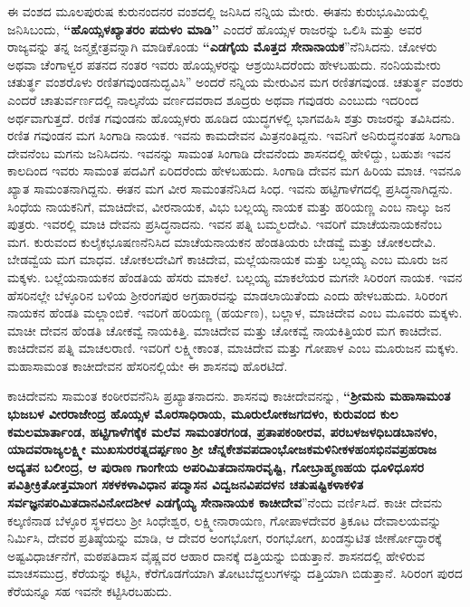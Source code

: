 ಈ ವಂಶದ ಮೂಲಪುರುಷ ಕುರುನಂದನರ ವಂಶದಲ್ಲಿ ಜನಿಸಿದ ನನ್ನಿಯ ಮೇರು. ಈತನು ಕುರುಭೂಮಿಯಲ್ಲಿ ಜನಿಸಿಬಂದು, \textbf{“ಹೊಯ್ಸಳಖ್ಯಾತರಂ ಪದುಳಂ ಮಾಡಿ”} ಎಂದರೆ ಹೊಯ್ಸಳ ರಾಜರನ್ನು ಒಲಿಸಿ ಮತ್ತು ಅವರ ರಾಜ್ಯವನ್ನು ತನ್ನ ಜನ್ಮಕ್ಷೇತ್ರವನ್ನಾಗಿ ಮಾಡಿಕೊಂಡು \textbf{“ಎಡಗೈಯ ಮೊತ್ತದ ಸೇನಾನಾಯಕ}”ನೆನಿಸಿದನು. ಚೋಳರು ಅಥವಾ ಚೆಂಗಾಳ್ವರ ಪತನದ ನಂತರ ಇವರು ಹೊಯ್ಸಳರನ್ನು ಆಶ್ರಯಿಸಿದರೆಂದು ಹೇಳಬಹುದು. ನಂನಿಯಮೇರು ಚತುರ್ತ್ಥ ವಂಶರೊಳು ರಣಿತಗವುಂಡನುದ್ಭವಿಸಿ” ಅಂದರೆ ನನ್ನಿಯ ಮೇರುವಿನ ಮಗ ರಣಿತಗವುಂಡ. ಚತುರ್ತ್ಥ ವಂಶರು ಎಂದರೆ ಚಾತುರ್ವರ್ಣದಲ್ಲಿ ನಾಲ್ಕನೆಯ ವರ್ಣದವರಾದ ಶೂದ್ರರು ಅಥವಾ ಗವುಡರು ಎಂಬುದು ಇದರಿಂದ ಅರ್ಥವಾಗುತ್ತದೆ. ರಣಿತ ಗವುಂಡನು ಹೊಯ್ಸಳರು ಹೂಡಿದ ಯುದ್ಧಗಳಲ್ಲಿ ಭಾಗವಹಿಸಿ ಶತ್ರು ರಾಜರನ್ನು ತವಿಸಿದನು. ರಣಿತ ಗವುಂಡನ ಮಗ ಸಿಂಗಾಡಿ ನಾಯಕ. ಇವನು ಕಾಮದೇವನ ಮಿತ್ರನಂತಿದ್ದನು. ಇವನಿಗೆ ಅನಿರುದ್ಧನಂತಹ ಸಿಂಗಾಡಿ ದೇವನೆಂಬ ಮಗನು ಜನಿಸಿದನು. ಇವನನ್ನು ಸಾಮಂತ ಸಿಂಗಾಡಿ ದೇವನೆಂದು ಶಾಸನದಲ್ಲಿ ಹೇಳಿದ್ದು, ಬಹುಶಃ ಇವನ ಕಾಲದಿಂದ ಇವರು ಸಾಮಂತ ಪದವಿಗೆ ಏರಿದರೆಂದು ಹೇಳಬಹುದು. ಸಿಂಗಾಡಿ ದೇವನ ಮಗ ಹಿರಿಯ ಮಾಚ. ಇವನೂ ಖ್ಯಾತ ಸಾಮಂತನಾಗಿದ್ದನು. ಈತನ ಮಗ ವೀರ ಸಾಮಂತನೆನಿಸಿದ ಸಿಂಧ. ಇವನು ಹಟ್ಟಿಗಾಳೆಗದಲ್ಲಿ ಪ್ರಸಿದ್ಧನಾಗಿದ್ದನು. ಸಿಂಧೆಯ ನಾಯಕನಿಗೆ, ಮಾಚಿದೇವ, ವೀರನಾಯಕ, ವಿಭು ಬಲ್ಲಯ್ಯ ನಾಯಕ ಮತ್ತು ಹರಿಯಣ್ಣ ಎಂಬ ನಾಲ್ಕು ಜನ ಪುತ್ರರು. ಇವರಲ್ಲಿ ಮಾಚಿ ದೇವನು ಪ್ರಸಿದ್ಧನಾದನು. ಇವನ ಪತ್ನಿ ಬಮ್ಮಲದೇವಿ. ಇವರಿಗೆ ಮಾಚೆಯನಾಯಕನೆಂಬ ಮಗ. ಕುರುವಂದ ಕುಲೈಕಭೂಷಣನೆನಿಸಿದ ಮಾಚೆಯನಾಯಕನ ಹೆಂಡತಿಯರು ಬೇಡವ್ವೆ ಮತ್ತು ಚೋಕಲದೇವಿ. ಬೇಡವ್ವೆಯ ಮಗ ಮಾಧವ. ಚೋಕಲದೇವಿಗೆ ಕಾಚಿದೇವ, ಮಲ್ಲೆಯನಾಯಕ ಮತ್ತು ಬಲ್ಲಯ್ಯ ಎಂಬ ಮೂರು ಜನ ಮಕ್ಕಳು. ಬಲ್ಲೆಯನಾಯಕನ ಹೆಂಡತಿಯ ಹೆಸರು ಮಾಕಲೆ. ಬಲ್ಲಯ್ಯ ಮಾಕಲೆಯರ ಮಗನೇ ಸಿರಿರಂಗ ನಾಯಕ. ಇವನ ಹೆಸರಿನಲ್ಲೇ ಬೆಳ್ಳೂರಿನ ಬಳಿಯ ಶ‍್ರೀರಂಗಪುರ ಅಗ್ರಹಾರವನ್ನು ಮಾಡಲಾಯಿತೆಂದು ಎಂದು ಹೇಳಬಹುದು. ಸಿರಿರಂಗ ನಾಯಕನ ಹೆಂಡತಿ ಮಲ್ಲಾಂಬಿಕೆ. ಇವರಿಗೆ ಹರಿಯಣ್ಣ (ಹರ್ಯಣ), ಬಲ್ಲಾಳ, ಮಾಚಿದೇವ ಎಂಬ ಮೂವರು ಮಕ್ಕಳು. ಮಾಚೀ ದೇವನ ಹೆಂಡತಿ ಚೋಕವ್ವೆ ನಾಯಕಿತ್ತಿ. ಮಾಚಿದೇವ ಮತ್ತು ಚೋಕವ್ವೆ ನಾಯಕಿತ್ತಿಯರ ಮಗ ಕಾಚಿದೇವ. ಕಾಚಿದೇವನ ಪತ್ನಿ ಮಾಚಲರಾಣಿ. ಇವರಿಗೆ ಲಕ್ಷ್ಮೀಕಾಂತ, ಮಾಚಿದೇವ ಮತ್ತು ಗೋಪಾಳ ಎಂಬ ಮೂರುಜನ ಮಕ್ಕಳು. ಮಹಾಸಾಮಂತ ಕಾಚೀದೇವನ ಹೆಸರಿನಲ್ಲಿಯೇ ಈ ಶಾಸನವು ಹೊರಟಿದೆ.

ಕಾಚಿದೇವನು ಸಾಮಂತ ಕಂಠೀರವನೆನಿಸಿ ಪ್ರಖ್ಯಾತನಾದನು. ಶಾಸನವು ಕಾಚೀದೇವನನ್ನು, \textbf{“ಶ‍್ರೀಮನು ಮಹಾಸಾಮಂತ ಭುಜಬಳ ವೀರರಾಜೇಂದ್ರ ಹೊಯ್ಸಳ ಮೊರಸಾಧಿರಾಯ, ಮೂರುಲೋಕಜಗದಳಂ, ಕುರುವಂದ ಕುಲ ಕಮಲ\-ಮಾರ್ತಾಂಡ, ಹಟ್ಟಿಗಾಳೆಗಕ್ಕೆಕ ಮಲೆವ ಸಾಮಂತರಗಂಡ, ಪ್ರತಾಪಕಂಠೀರವ, ಪರಬಳಜಳಧಿಬಡಬಾನಳಂ, ಯಾದವರಾಜ್ಯ\-ಲಕ್ಷ್ಮೀ ಮುಖಸುರರತ್ನದರ್ಪ್ಪಣಂ ಶ‍್ರೀ ಚೆನ್ನಕೇಶವಪದಾಂಭೋಜಕಮಳಿನೀಕಳಹಂಸಭಿನವಪ್ರಹರಾಜ ಅದ್ಯತನ ಬಲೀಂದ್ರ, ಆ ಪುರಾಣ ಗಾಂಗೇಯ ಅಪರಿಮಿತದಾನಸಾರವೃಷ್ಟಿ, ಗೋಬ್ರಾಹ್ಮಣಹಯ ಧೂಳಿಧೂಸರ ಪವಿತ್ರೀಕ್ರಿತೋತ್ತಮಾಂಗ\general{\break } ಸಕಳಕಳಾವಿಧಾನ ಪದ್ಮಾಸನ ವಿದ್ವಜನವಿಪದಳನ ಚತುಷಷ್ಟಿಕಳಾಕಳಿತ ಸರ್ವಜ್ಞನಪರಿಮಿತದಾನವಿನೋದಶೀಳ ಎಡಗೈಯ್ಯ\general{\break } ಸೇನಾನಾಯಕ ಕಾಚೀದೇವ}”ನೆಂದು ವರ್ಣಿಸಿದೆ. ಕಾಚೀ ದೇವನು ಕಲ್ಕಣಿನಾಡ ಬೆಳ್ಳೂರ ಸ್ಥಳದಲು ಶ‍್ರೀ ಸಿಂಧೇಶ್ವರ, ಲಕ್ಷ್ಮೀನಾರಾಯಣ, ಗೋಪಾಳದೇವರ ತ್ರಿಕೂಟ ದೇವಾಲಯವನ್ನು ನಿರ್ಮಿಸಿ, ದೇವರ ಪ್ರತಿಷ್ಠೆಯನ್ನು ಮಾಡಿ, ಆ ದೇವರ ಅಂಗಭೋಗ, ರಂಗಭೋಗ, ಖಂಡಸ್ಫುಟಿತ ಜೀರ್ಣೋದ್ಧಾರಕ್ಕೆ ಅಷ್ಟವಿಧಾರ್ಚನೆಗೆ, ಮಠಪತಿದಾಸ ವೈಷ್ಣವರ ಆಹಾರ ದಾನಕ್ಕೆ ದತ್ತಿಯನ್ನು ಬಿಡುತ್ತಾನೆ. ಶಾಸನದಲ್ಲಿ ಹೇಳಿರುವ ಮಾಚಸಮುದ್ರ, ಕೆರೆಯನ್ನು ಕಟ್ಟಿಸಿ, ಕೆರೆಗೊಡಗೆಯಾಗಿ ತೋಟ\break ಬೆದ್ದಲುಗಳನ್ನು ದತ್ತಿಯಾಗಿ ಬಿಡುತ್ತಾನೆ. ಸಿರಿರಂಗ ಪುರದ ಕೆರೆಯನ್ನೂ ಸಹ ಇವನೇ ಕಟ್ಟಿಸಿರಬಹುದು.

